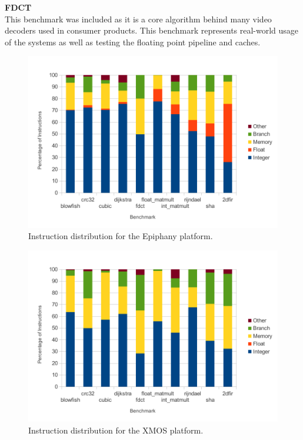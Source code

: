 \documentclass[twocolumn]{article}
\begin{document}
\vspace{3mm}
\textbf{FDCT}\\
This benchmark was included as it is a core algorithm behind many video decoders used in consumer products. This benchmark represents real-world usage of the systems as well as testing the floating point pipeline and caches.

\begin{figure}[t]
	\includegraphics[width=\linewidth]{epiphany.pdf}
	\caption{Instruction distribution for the Epiphany platform.}
	\label{Fig:InstructionDistributionEpiphany}
\end{figure}

\begin{figure}[t]
	\includegraphics[width=\linewidth]{xmos.pdf}
	\caption{Instruction distribution for the XMOS platform.}
	\label{Fig:InstructionDistributionXMOS}
\end{figure}
\end{document}
